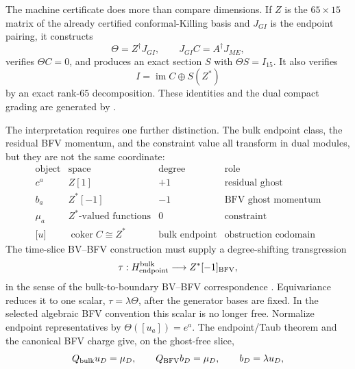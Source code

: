\documentclass[11pt]{article}
\theoremstyle{definition}
\theoremstyle{remark}
\begin{document}
The machine certificate does more than compare dimensions.  If $Z$ is the
$65\times15$ matrix of the already certified conformal-Killing basis and
$J_{GI}$ is the endpoint pairing, it constructs
\begin{equation}
 \Theta=Z^\dagger J_{GI},
 \qquad
 J_{GI}C=A^\dagger J_{ME},
\end{equation}
verifies $\Theta C=0$, and produces an exact section $S$ with
$\Theta S=I_{15}$.  It also verifies
\begin{equation}
 I=\operatorname{im}C\oplus S(Z^*)
\end{equation}
by an exact rank-$65$ decomposition.  These identities and the dual compact
grading are generated by
.

The interpretation requires one further distinction.  The bulk endpoint
class, the residual BFV momentum, and the constraint value all transform in
dual modules, but they are not the same coordinate:
\begin{equation}\label{eq:residual-role-table}
 \begin{array}{c|c|c|c}
 \text{object}&\text{space}&\text{degree}&\text{role}\\ \hline
 c^a&Z[1]&+1&\text{residual ghost}\\
 b_a&Z^*[-1]&-1&\text{BFV ghost momentum}\\
 \mu_a&Z^*\text{-valued functions}&0&\text{constraint}\\
 \lbrack u\rbrack&\operatorname{coker}C\cong Z^*&\text{bulk endpoint}&\text{obstruction codomain}
 \end{array}
\end{equation}
The time-slice BV--BFV construction must supply a degree-shifting
transgression
\begin{equation}\label{eq:zero-mode-transgression}
 \tau:H^{\rm bulk}_{\rm endpoint}\longrightarrow Z^*[-1]_{\rm BFV},
\end{equation}
in the sense of the bulk-to-boundary BV--BFV correspondence
\cite{CattaneoMnevReshetikhin}.
Equivariance reduces it to one scalar,
$\tau=\lambda\Theta$, after the generator bases are fixed.  In the selected
algebraic BFV convention this scalar is no longer free.  Normalize endpoint
representatives by $\Theta([u_a])=e^a$.  The endpoint/Taub theorem and the
canonical BFV charge give, on the ghost-free slice,
\begin{equation}\label{eq:lambda-sign-test}
 Q_{\rm bulk}u_D=\mu_D,
 \qquad
 Q_{\rm BFV}b_D=\mu_D,
 \qquad b_D=\lambda u_D,
\end{equation}
\end{document}
